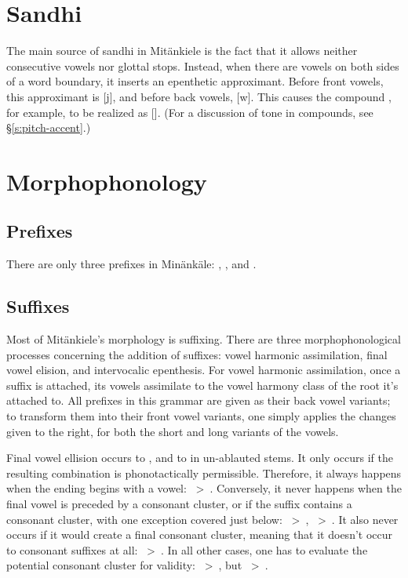\section{Sandhi}
The main source of sandhi in Mit\"ankiele is the fact that it allows neither
consecutive vowels nor glottal stops. Instead, when there are vowels on both
sides of a word boundary, it inserts an epenthetic approximant. Before front
vowels, this approximant is [j], and before back vowels, [w]. This causes the
compound , for example, to be realized as []. (For a
discussion of tone in compounds, see \S\ref{s:pitch-accent}.)

\section{Morphophonology}
\subsection{Prefixes}
There are only three prefixes in Min\"ank\"ale: , , and
.
\subsection{Suffixes}
Most of Mit\"ankiele's morphology is suffixing. There are three
morphophonological processes concerning the addition of suffixes: vowel harmonic
assimilation, final vowel elision, and intervocalic epenthesis.
For vowel harmonic assimilation, once a suffix is attached, its vowels assimilate
to the vowel harmony class of the root it's attached to. All prefixes in this
grammar are given as their back vowel variants; to transform them into their
front vowel variants, one simply applies the changes given to the right, for
both the short and long variants of the vowels.

Final vowel ellision occurs to , and to  in un-ablauted
stems. It only occurs if the resulting combination is phonotactically
permissible. Therefore, it always happens when the ending begins with a vowel:
~>~. Conversely, it never happens when the final vowel is
preceded by a consonant cluster, or if the suffix contains a consonant cluster,
with one exception covered just below: ~>~,
~>~. It also never occurs if it would create a final
consonant cluster, meaning that it doesn't occur to consonant suffixes at all:
~>~. In all other cases, one has to evaluate the potential
consonant cluster for validity: ~>~, but
~>~.

